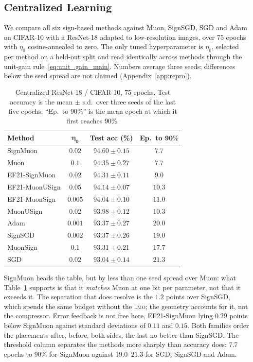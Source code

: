 \subsection{Centralized Learning}
We compare all six sign-based methods against Muon, SignSGD, SGD and Adam on CIFAR-10 \cite{krizhevsky2009cifar} with a ResNet-18 adapted to low-resolution images, over $75$ epochs with $\eta_0$ cosine-annealed to zero. The only tuned hyperparameter is $\eta_0$, selected per method on a held-out split and read identically across methods through the unit-gain rule~\eqref{eq:unit_gain_main}. Numbers average three seeds; differences below the seed spread are not claimed (Appendix~\ref{app:repro}).

\begin{table}[!tb]
\centering
\small
\renewcommand{\arraystretch}{1.15}
\begin{tabular}{@{}lccc@{}}
\toprule
\textbf{Method} & $\boldsymbol{\eta_0}$ & \textbf{Test acc (\%)} & \textbf{Ep.\ to $\mathbf{90\%}$} \\
\midrule
SignMuon & $0.02$ & $94.60 \pm 0.15$ & $7.7$ \\
Muon & $0.1$ & $94.35 \pm 0.27$ & $7.7$ \\
EF21-SignMuon & $0.02$ & $94.31 \pm 0.11$ & $9.0$ \\
EF21-MuonUSign & $0.05$ & $94.14 \pm 0.07$ & $10.3$ \\
EF21-MuonSign & $0.005$ & $94.04 \pm 0.10$ & $11.0$ \\
MuonUSign & $0.02$ & $93.98 \pm 0.12$ & $10.3$ \\
Adam & $0.001$ & $93.37 \pm 0.27$ & $20.0$ \\
SignSGD & $0.002$ & $93.37 \pm 0.26$ & $19.0$ \\
MuonSign & $0.1$ & $93.31 \pm 0.21$ & $17.7$ \\
SGD & $0.02$ & $93.04 \pm 0.14$ & $21.3$ \\
\bottomrule
\end{tabular}
\caption{Centralized ResNet-18 / CIFAR-10, $75$ epochs. Test accuracy is the mean $\pm$ s.d.\ over three seeds of the last five epochs; ``Ep.\ to $90\%$'' is the mean epoch at which it first reaches $90\%$.}
\label{tab:cifar_main}
\end{table}

SignMuon heads the table, but by less than one seed spread over Muon: what Table~\ref{tab:cifar_main} supports is that it \emph{matches} Muon at one bit per parameter, not that it exceeds it. The separation that does resolve is the $1.2$ points over SignSGD, which spends the same budget without the \textsc{lmo}; the geometry accounts for it, not the compressor. Error feedback is not free here, EF21-SignMuon lying $0.29$ points below SignMuon against standard deviations of $0.11$ and $0.15$. Both families order the placements after, before, both sides, the last no better than SignSGD. The threshold column separates the methods more sharply than accuracy does: $7.7$ epochs to $90\%$ for SignMuon against $19.0$--$21.3$ for SGD, SignSGD and Adam.

